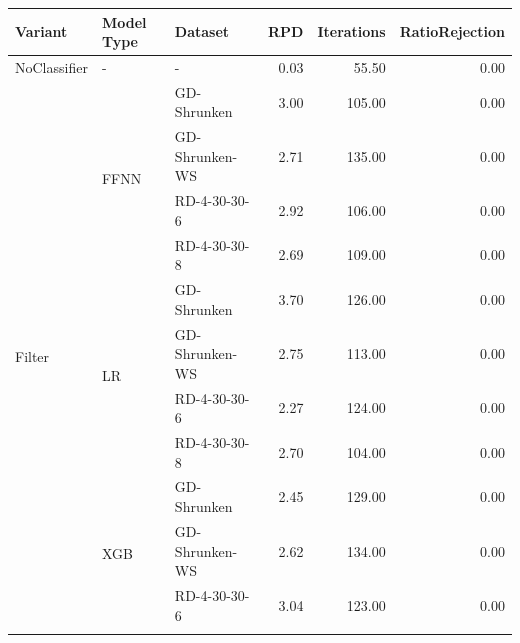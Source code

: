 \begin{table}[ht]
	\scriptsize
	\centering
	\begin{tabular}{lllrrr}
		\toprule
		\textbf{Variant}             & \textbf{Model Type}      & \textbf{Dataset} & \textbf{RPD} & \textbf{Iterations} & \textbf{RatioRejection} \\
		\midrule
		NoClassifier                 & -                        & -                & 0.03         & 55.50               & 0.00                    \\\midrule
		\multirow[t]{12}{*}{Filter}  & \multirow[t]{4}{*}{FFNN} & GD-Shrunken      & 3.00         & 105.00              & 0.00                    \\\cmidrule(lr){3-6}
		                             &                          & GD-Shrunken-WS   & 2.71         & 135.00              & 0.00                    \\\cmidrule(lr){3-6}
		                             &                          & RD-4-30-30-6     & 2.92         & 106.00              & 0.00                    \\\cmidrule(lr){3-6}
		                             &                          & RD-4-30-30-8     & 2.69         & 109.00              & 0.00                    \\\cmidrule(lr){2-6}
		                             & \multirow[t]{4}{*}{LR}   & GD-Shrunken      & 3.70         & 126.00              & 0.00                    \\\cmidrule(lr){3-6}
		                             &                          & GD-Shrunken-WS   & 2.75         & 113.00              & 0.00                    \\\cmidrule(lr){3-6}
		                             &                          & RD-4-30-30-6     & 2.27         & 124.00              & 0.00                    \\\cmidrule(lr){3-6}
		                             &                          & RD-4-30-30-8     & 2.70         & 104.00              & 0.00                    \\\cmidrule(lr){2-6}
		                             & \multirow[t]{4}{*}{XGB}  & GD-Shrunken      & 2.45         & 129.00              & 0.00                    \\\cmidrule(lr){3-6}
		                             &                          & GD-Shrunken-WS   & 2.62         & 134.00              & 0.00                    \\\cmidrule(lr){3-6}
		                             &                          & RD-4-30-30-6     & 3.04         & 123.00              & 0.00                    \\\cmidrule(lr){3-6}

\end{tabular}
\end{table}
